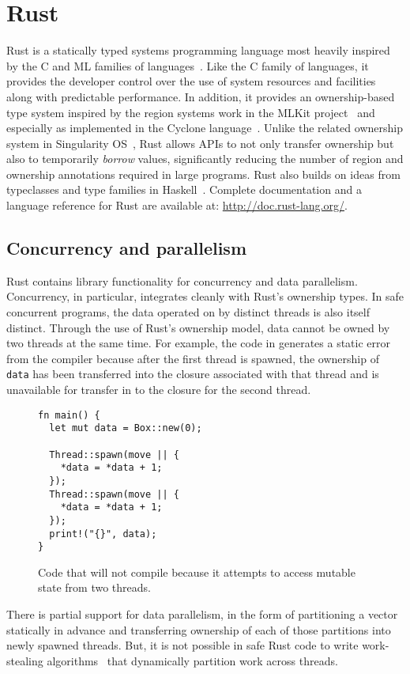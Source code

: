 
\section{Rust}
\label{sec:rust}

Rust is a statically typed systems programming language most heavily inspired by the C
and ML families of languages~\cite{RUST}.
Like the C family of languages, it provides the developer control over the use of system
resources and facilities along with predictable performance.
In addition, it provides an ownership-based type system inspired by the region systems work in the
MLKit project~\cite{mlkit} and especially as implemented in the Cyclone language~\cite{cyclone}.
Unlike the related ownership system in Singularity OS~\cite{singularity}, Rust allows APIs to
not only transfer ownership but also to temporarily \emph{borrow} values, significantly
reducing the number of region and ownership annotations required in large programs.
Rust also builds on ideas from typeclasses and type families in Haskell~\cite{haskell}.
Complete documentation and a language reference for Rust are available at: \url{http://doc.rust-lang.org/}.

\subsection{Concurrency and parallelism}
Rust contains library functionality for concurrency and data parallelism.
Concurrency, in particular, integrates cleanly with Rust's ownership types.
In safe concurrent programs, the data operated on by distinct threads is also itself distinct.
Through the use of Rust's ownership model, data cannot be owned by two threads at the same time.
For example, the code in  generates a static error from the compiler because
after the first thread is spawned, the ownership of \lstinline{data} has been transferred into the
closure associated with that thread and is unavailable for transfer in to the closure for the second thread.
\begin{figure}
\begin{lstlisting}
fn main() {
  let mut data = Box::new(0);

  Thread::spawn(move || {
    *data = *data + 1;
  });
  Thread::spawn(move || {
    *data = *data + 1;
  });
  print!("{}", data);
}
\end{lstlisting}
  \caption{Code that will not compile because it attempts to access mutable state from two threads.}
  \label{fig:bad-concurrency}
\end{figure}

There is partial support for data parallelism, in the form of partitioning a vector statically in advance
and transferring ownership of each of those partitions into newly spawned threads.
But, it is not possible in safe Rust code to write work-stealing algorithms~\cite{blumeofe:multiprogrammed-work-stealing}
that dynamically partition work across threads.


